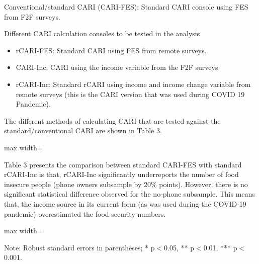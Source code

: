 \documentclass[11pt,harvard]{article}
\begin{document}
Conventional/standard CARI (CARI-FES): Standard CARI console using FES from F2F surveys.

Different CARI calculation consoles to be tested in the analysis
\begin{itemize}[label=--, left=1.5em]
	\item rCARI-FES: Standard CARI using FES from remote surveys.
	\item CARI-Inc: CARI using the income variable from the F2F surveys.
	\item rCARI-Inc: Standard rCARI using income and income change variable from remote surveys (this is the CARI version that was used during COVID 19 Pandemic).
\end{itemize}

The different methods of calculating CARI that are tested against the standard/conventional CARI are shown in Table 3. 


\begin{table}[htbp]
	\centering
	\begin{adjustbox}{max width=\textwidth}
		\begin{threeparttable}
			\caption{The different versions of CARI \& their indicators}
			\scriptsize
			 
			\label{tab:Aggregation_Table}
		\end{threeparttable}
	\end{adjustbox}
\end{table}

Table 3 presents the comparison between standard CARI-FES with standard rCARI-Inc is that, rCARI-Inc significantly underreports the number of food insecure people (phone owners subsample by 20\% points). However, there is no significant statistical difference observed for the no-phone subsample. This means that, the income source in its current form (as was used during the COVID-19 pandemic) overestimated the food security numbers.

	\begin{table}[htbp]
		\centering
		\begin{adjustbox}{max width=\textwidth}
			\begin{threeparttable}
				\caption{Impact of Survey Modality: Standard CARI-FES vs. Standard rCARI-Inc}
				\scriptsize
				 
				\label{tab:CARI_rCARI_Modality_CAR}
				\begin{tablenotes}
					\item Note: Robust standard errors in parentheses; * p$<$0.05, ** p$<$0.01, *** p$<$0.001. 
				\end{tablenotes}
			\end{threeparttable}
		\end{adjustbox}
	\end{table}
\end{document}

